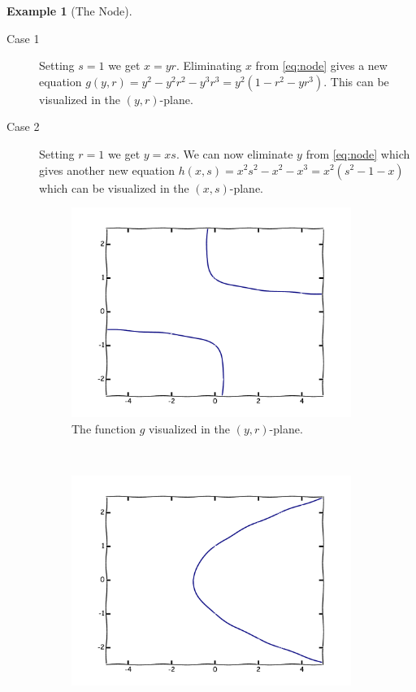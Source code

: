 \documentclass{article}
\theoremstyle{definition}
\newtheorem{example}{Example}
\begin{document}
\begin{example}[The Node]
    \begin{description}
        \item[Case 1] Setting $s = 1$ we get $x = yr$. Eliminating $x$ from
            \cref{eq:node} gives a new equation $g(y, r) = y^2 - y^2r^2 -
            y^3r^3 = y^2(1 - r^2 - yr^3)$. This can be visualized in the $(y,
            r)$-plane.
        \item[Case 2] Setting $r = 1$ we get $y = xs$. We can now eliminate $y$
            from \cref{eq:node} which gives another new equation $h(x, s) =
            x^2s^2 - x^2 - x^3 = x^2(s^2 - 1 - x)$ which can be visualized in
            the $(x, s)$-plane.
    \end{description}
    \begin{figure}[h!]
        \centering
        \begin{subfigure}[t]{0.3\textwidth}
            \includegraphics[width=\textwidth]{../pictures/case_1.pdf} 
            \caption{The function $g$ visualized in the $(y, r)$-plane.}
        \end{subfigure}
        ~
        \begin{subfigure}[t]{0.3\textwidth}
            \includegraphics[width=\textwidth]{../pictures/case_2.pdf} 

\end{subfigure}
\end{figure}
\end{example}
\end{document}
